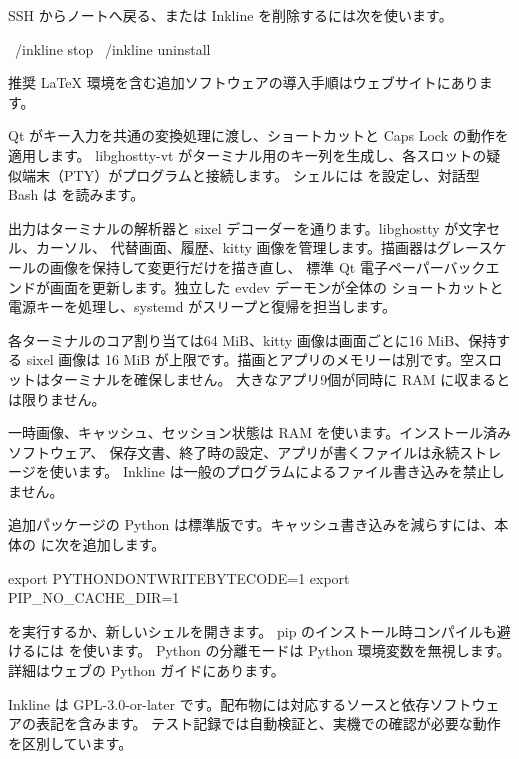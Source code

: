SSH からノートへ戻る、または Inkline を削除するには次を使います。
\begin{shell}
~/inkline stop
~/inkline uninstall
\end{shell}
推奨 LaTeX 環境を含む追加ソフトウェアの導入手順はウェブサイトにあります。

Qt がキー入力を共通の変換処理に渡し、ショートカットと Caps Lock の動作を適用します。
libghostty-vt がターミナル用のキー列を生成し、各スロットの疑似端末（PTY）がプログラムと接続します。
シェルには  を設定し、対話型 Bash は  を読みます。

出力はターミナルの解析器と sixel デコーダーを通ります。libghostty が文字セル、カーソル、
代替画面、履歴、kitty 画像を管理します。描画器はグレースケールの画像を保持して変更行だけを描き直し、
標準 Qt 電子ペーパーバックエンドが画面を更新します。独立した evdev デーモンが全体の
ショートカットと電源キーを処理し、systemd がスリープと復帰を担当します。

各ターミナルのコア割り当ては64 MiB、kitty 画像は画面ごとに16 MiB、保持する sixel 画像は
16 MiB が上限です。描画とアプリのメモリーは別です。空スロットはターミナルを確保しません。
大きなアプリ9個が同時に RAM に収まるとは限りません。

一時画像、キャッシュ、セッション状態は RAM を使います。インストール済みソフトウェア、
保存文書、終了時の設定、アプリが書くファイルは永続ストレージを使います。
Inkline は一般のプログラムによるファイル書き込みを禁止しません。

追加パッケージの Python は標準版です。キャッシュ書き込みを減らすには、本体の
 に次を追加します。
\begin{shell}
export PYTHONDONTWRITEBYTECODE=1
export PIP_NO_CACHE_DIR=1
\end{shell}
 を実行するか、新しいシェルを開きます。
pip のインストール時コンパイルも避けるには
 を使います。
Python の分離モードは Python 環境変数を無視します。詳細はウェブの Python ガイドにあります。

Inkline は GPL-3.0-or-later です。配布物には対応するソースと依存ソフトウェアの表記を含みます。
テスト記録では自動検証と、実機での確認が必要な動作を区別しています。
